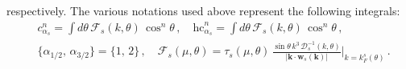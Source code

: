 \documentclass[aps,prb,onecolumn,nofootinbib,citeautoscript,10pt, showkeys]{revtex4-2}
\def \nn{\nonumber \\}
\begin{document}
respectively.
The various notations used above represent the following integrals:
\begin{align}
& c_{\alpha_s}^n = \int d\theta \, {\mathcal F}_s (k,\theta)  \,\cos^n \theta  \,, \quad
\text{hc}_{\alpha_s}^n = \int d\theta \, {\mathcal F}_s (k,\theta)  \,\cos^n \theta \,, \nn &
\lbrace \alpha_{1/2}, \, \alpha_{3/2}  \rbrace = \lbrace 1, \, 2  \rbrace\,,
\quad {\mathcal F}_s (\mu,\theta) = \tau_s (\mu,\theta)\,
 \frac{\sin \theta \,k^3 
\, {\mathcal D}^{-1}_s (k, \theta)
}
{  |\boldsymbol k  \cdot {\boldsymbol{w}}_s (\boldsymbol k)  | }
\Bigg \vert_{ k  = k_F^s (\theta) } \,.
\end{align}

 


\end{document}
